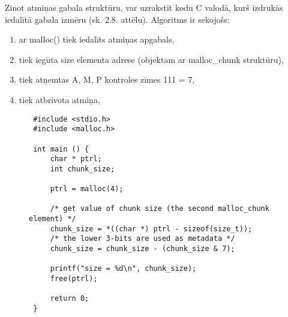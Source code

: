 

Zinot atmiņas gabala struktūru, var uzrakstīt kodu C valodā, kurš izdrukās iedalītā gabala izmēru (sk. 2.8. attēlu).
Algoritms ir sekojošs: 
\begin{enumerate}
\item ar malloc() tiek iedalīts atmiņas apgabals,
\item  tiek iegūta size elementa adrese (objektam ar malloc\_chunk struktūru),
\item  tiek atņemtas A, M, P kontroles zīmes 111 = 7,
\item  tiek atbrīvota atmiņa,
\end{enumerate}
\begin{figure}[h]
\begin{lstlisting}
 #include <stdio.h>
 #include <malloc.h>

 int main () {
     char * ptrl;
     int chunk_size;

     ptrl = malloc(4);
 
     /* get value of chunk size (the second malloc_chunk element) */
     chunk_size = *((char *) ptrl - sizeof(size_t));
     /* the lower 3-bits are used as metadata */
     chunk_size = chunk_size - (chunk_size & 7);
 
     printf("size = %d\n", chunk_size);
     free(ptrl);
 
     return 0;
 }
\end{lstlisting}
\caption{\textbf{\fontsize{11}{12}\selectfont {Izmēra noteikšana iedalītām gabalam}}}
\end{figure}